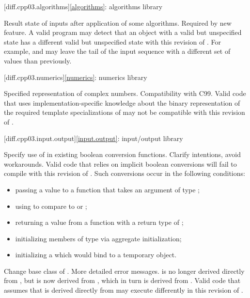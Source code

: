 [diff.cpp03.algorithms]{\ref{algorithms}: algorithms library}

\change
Result state of inputs after application of some algorithms.
\rationale
Required by new feature.
\effect
A valid \CppIII{} program may detect that an object with a valid but
unspecified state has a different valid but unspecified state with this
revision of \Cpp{}. For example,  and
 may leave the tail of the input sequence with a
different set of values than previously.

[diff.cpp03.numerics]{\ref{numerics}: numerics library}

\change
Specified representation of complex numbers.
\rationale
Compatibility with C99.
\effect
Valid \CppIII{} code that uses implementation-specific knowledge about the
binary representation of the required template specializations of
 may not be compatible with this revision of \Cpp{}.

[diff.cpp03.input.output]{\ref{input.output}: input/output library}

\change
Specify use of  in existing boolean conversion functions.
\rationale
Clarify intentions, avoid workarounds.
\effect
Valid \CppIII{} code that relies on implicit boolean conversions will fail to
compile with this revision of \Cpp{}. Such conversions occur in the
following conditions:
\begin{itemize}
\item passing a value to a function that takes an argument of type ;
\item using  to compare to  or ;
\item returning a value from a function with a return type of ;
\item initializing members of type  via aggregate initialization;
\item initializing a  which would bind to a temporary object.
\end{itemize}

\change
Change base class of .
\rationale
More detailed error messages.
\effect
{} is no longer derived directly from
, but is now derived from ,
which in turn is derived from . Valid \CppIII{} code
that assumes that  is derived directly from
 may execute differently in this revision of \Cpp{}.

